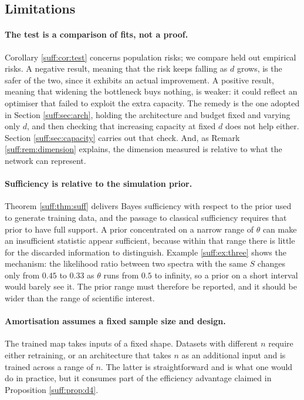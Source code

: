 \subsection{Limitations}

\paragraph{The test is a comparison of fits, not a proof.} Corollary \ref{suff:cor:test}
concerns population risks; we compare held out empirical risks. A negative result, meaning
that the risk keeps falling as $d$ grows, is the safer of the two, since it exhibits an actual
improvement. A positive result, meaning that widening the bottleneck buys nothing, is weaker:
it could reflect an optimiser that failed to exploit the extra capacity. The remedy is the
one adopted in Section \ref{suff:sec:arch}, holding the architecture and budget fixed and
varying only $d$, and then checking that increasing capacity at fixed $d$ does not help
either. Section \ref{suff:sec:capacity} carries out that check. And, as Remark
\ref{suff:rem:dimension} explains, the dimension measured is relative to what the network can
represent.

\paragraph{Sufficiency is relative to the simulation prior.} Theorem \ref{suff:thm:suff}
delivers Bayes sufficiency with respect to the prior used to generate training data, and the
passage to classical sufficiency requires that prior to have full support. A prior
concentrated on a narrow range of $\theta$ can make an insufficient statistic appear
sufficient, because within that range there is little for the discarded information to
distinguish. Example \ref{suff:ex:three} shows the mechanism: the likelihood ratio between two
spectra with the same $S$ changes only from $0.45$ to $0.33$ as $\theta$ runs from $0.5$ to
infinity, so a prior on a short interval would barely see it. The prior range must therefore
be reported, and it should be wider than the range of scientific interest.

\paragraph{Amortisation assumes a fixed sample size and design.} The trained map takes inputs
of a fixed shape. Datasets with different $n$ require either retraining, or an architecture
that takes $n$ as an additional input and is trained across a range of $n$. The latter is
straightforward and is what one would do in practice, but it consumes part of the efficiency
advantage claimed in Proposition \ref{suff:prop:d4}.

